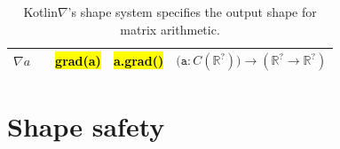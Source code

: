 \documentclass[12pt,initial,twoside,maitrise]{dms}
\newcommand{\inline}[1]{%
    \begingroup%
    \sethlcolor{slightgray}%
    \hl{\ttfamily\footnotesize #1}%
    \endgroup
}
\newcommand{\tinline}[1]{%
    \begingroup%
    \sethlcolor{slightgray}%
    \hl{\ttfamily\tiny #1}%
    \endgroup
}
\numberwithin{equation}{section}
\numberwithin{table}{chapter}
\numberwithin{figure}{chapter}
\begin{document}
{\begin{table}
\begin{tabular}{|c|c|c|c|l|}
               $\nabla a$                                      &                                                                                  & \tinline{grad(a)}                                                                         & \tinline{a.grad()}                                                                           & $                   \big(\texttt{a}: C(\mathbb{R}^{?})\big) \rightarrow (\mathbb{R}^{?}\rightarrow\mathbb{R}^{?})                                                                                          $ \\ \hline
    \end{tabular}
\caption{\label{tab:shape_system}Kotlin$\nabla$'s shape system specifies the output shape for matrix arithmetic.}
\end{table}
}

\section{Shape safety}\label{sec:shape-safety}
\end{document}
